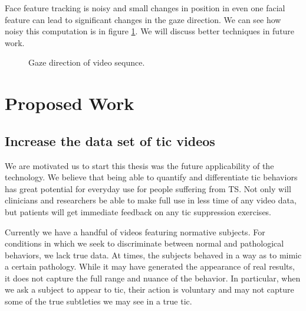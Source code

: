 \documentclass[11pt]{article}
\begin{document}
Face feature tracking is noisy and small changes in position in even one facial feature can lead to significant changes in the gaze direction. We can see how noisy this computation is in figure \ref{gazegraph}. We will discuss better techniques in future work.
\begin{figure}%
    \centering
    \caption{Gaze direction of video sequnce.}
    \label{gazegraph}%
\end{figure}

\section{Proposed Work}
\subsection{Increase the data set of tic videos}
We are motivated us to start this thesis was the future applicability of the technology. We believe that being able to quantify and differentiate tic behaviors has great potential for everyday use for people suffering from TS. Not only will clinicians and researchers be able to make full use in less time of any video data, but patients will get immediate feedback on any tic suppression exercises.

Currently we have a handful of videos featuring normative subjects. For conditions in which we seek to discriminate between normal and pathological behaviors, we lack true data. At times, the subjects behaved in a way as to mimic a certain pathology. While it may have generated the appearance of real results, it does not capture the full range and nuance of the behavior. In particular, when we ask a subject to appear to tic, their action is voluntary and may not capture some of the true subtleties we may see in a true tic.
\end{document}
